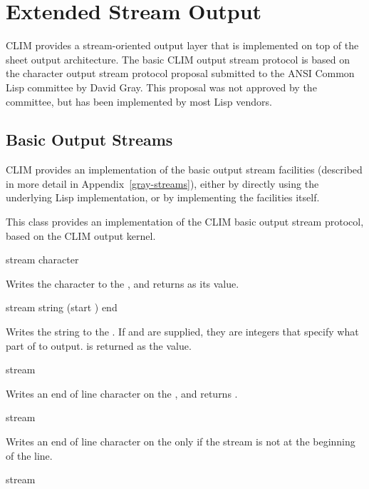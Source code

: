 
\chapter {Extended Stream Output}
\label {extended-output}

CLIM provides a stream-oriented output layer that is implemented on top of the
sheet output architecture.  The basic CLIM output stream protocol is based on
the character output stream protocol proposal submitted to the ANSI Common Lisp
committee by David Gray.  This proposal was not approved by the committee, but
has been implemented by most Lisp vendors.

\section {Basic Output Streams}

CLIM provides an implementation of the basic output stream facilities (described
in more detail in Appendix~\ref{gray-streams}), either by directly using the
underlying Lisp implementation, or by implementing the facilities itself.


This class provides an implementation of the CLIM basic output stream protocol,
based on the CLIM output kernel.
\Mutable

 {stream character}

Writes the character  to the  ,
and returns  as its value.

 {stream string \optional (start ) end}

Writes the string  to the  .  If
 and  are supplied, they are integers that specify what part
of  to output.   is returned as the value.

 {stream}

Writes an end of line character on the  , and
returns .

 {stream}

Writes an end of line character on the   only if
the stream is not at the beginning of the line.

 {stream}

